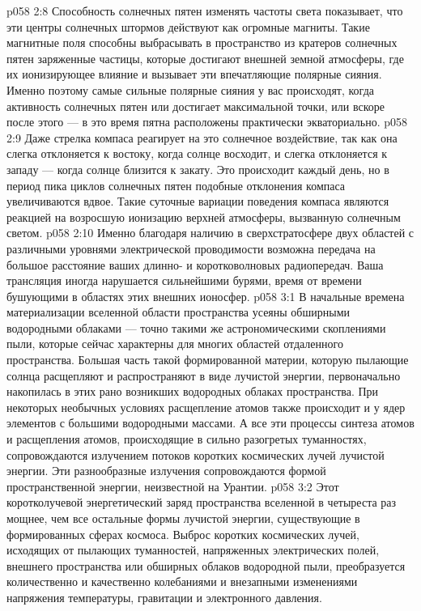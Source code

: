 \vs p058 2:8 Способность солнечных пятен изменять частоты света показывает, что эти центры солнечных штормов действуют как огромные магниты. Такие магнитные поля способны выбрасывать в пространство из кратеров солнечных пятен заряженные частицы, которые достигают внешней земной атмосферы, где их ионизирующее влияние и вызывает эти впечатляющие полярные сияния. Именно поэтому самые сильные полярные сияния у вас происходят, когда активность солнечных пятен или достигает максимальной точки, или вскоре после этого --- в это время пятна расположены практически экваториально.
\vs p058 2:9 Даже стрелка компаса реагирует на это солнечное воздействие, так как она слегка отклоняется к востоку, когда солнце восходит, и слегка отклоняется к западу --- когда солнце близится к закату. Это происходит каждый день, но в период пика циклов солнечных пятен подобные отклонения компаса увеличиваются вдвое. Такие суточные вариации поведения компаса являются реакцией на возросшую ионизацию верхней атмосферы, вызванную солнечным светом.
\vs p058 2:10 Именно благодаря наличию в сверхстратосфере двух областей с различными уровнями электрической проводимости возможна передача на большое расстояние ваших длинно\hyp{} и коротковолновых радиопередач. Ваша трансляция иногда нарушается сильнейшими бурями, время от времени бушующими в областях этих внешних ионосфер.
\vs p058 3:1 В начальные времена материализации вселенной области пространства усеяны обширными водородными облаками --- точно такими же астрономическими скоплениями пыли, которые сейчас характерны для многих областей отдаленного пространства. Большая часть такой формированной материи, которую пылающие солнца расщепляют и распространяют в виде лучистой энергии, первоначально накопилась в этих рано возникших водородных облаках пространства. При некоторых необычных условиях расщепление атомов также происходит и у ядер элементов с большими водородными массами. А все эти процессы синтеза атомов и расщепления атомов, происходящие в сильно разогретых туманностях, сопровождаются излучением потоков коротких космических лучей лучистой энергии. Эти разнообразные излучения сопровождаются формой пространственной энергии, неизвестной на Урантии.
\vs p058 3:2 Этот коротколучевой энергетический заряд пространства вселенной в четыреста раз мощнее, чем все остальные формы лучистой энергии, существующие в формированных сферах космоса. Выброс коротких космических лучей, исходящих от пылающих туманностей, напряженных электрических полей, внешнего пространства или обширных облаков водородной пыли, преобразуется количественно и качественно колебаниями и внезапными изменениями напряжения температуры, гравитации и электронного давления.

